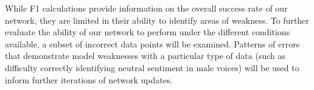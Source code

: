 While F1 calculations provide information on the overall success rate of our
network, they are limited in their ability to identify areas of weakness. To
further evaluate the ability of our network to perform under the different
conditions available, a subset of incorrect data points will be examined.
Patterns of errors that demonstrate model weaknesses with a particular type of
data (such as difficulty correctly identifying neutral sentiment in male
voices) will be used to inform further iterations of network updates. 
